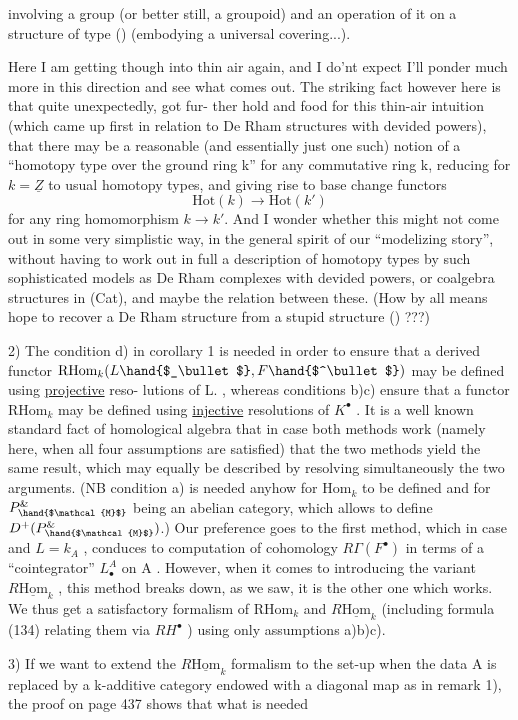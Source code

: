 
involving a group (or better still, a groupoid) and an operation of 
it on a structure of type (\unsure{$\ast$}) (embodying a universal covering...).

Here I am getting though into thin air again, and I do'nt expect
I'll ponder much more in this direction and see what comes out. The
striking fact however  here is that quite unexpectedly,  got fur-%
ther hold and food for this thin-air intuition (which came up first in
relation to De Rham structures with devided powers), that there may be
a reasonable (and essentially just one such) notion of a ``homotopy type
over the ground ring k'' for any commutative ring k, reducing for $k=\underline{Z}$
to usual homotopy types, and giving rise to base change functors
\[ \mathrm{Hot}(k) \longrightarrow \mathrm{Hot}(k') \]
for any ring homomorphism $k\to k'$. And I wonder whether this might not
come out in some very simplistic way, in the general spirit of our
``modelizing story'', without having to work out in full a description
of homotopy types by such sophisticated models as De Rham complexes
with devided powers, or coalgebra structures in (Cat), and  maybe the
relation between these. (How by all means hope to recover a De Rham
structure from a stupid structure (\unsure{$\ast$}) ???)

2) The condition d) in corollary 1 is needed in order to ensure
 that a derived functor $\mathrm{RHom}_k(L\hand{$_\bullet$},F\hand{$^\bullet$})$ may be defined using \uline{projective} reso-%
lutions of L. , whereas conditions b)\hand{,}c) ensure that a functor
$\mathrm{RHom}_k$ may be defined using  \uline{injective} resolutions of $K^\bullet$ . It is
a well known standard fact of homological algebra that in case both
methods work (namely here, when all four assumptions are satisfied)
that the two methods yield the same result, which may equally be
described by resolving simultaneously the two arguments. (NB condition
a) is needed anyhow for $\mathrm{Hom}_k$ to be defined and for $P^{\&}_{\hand{$\mathcal{M}$}}$ being an abelian
category, which allows to define $D^+(P^{\&}_{\hand{$\mathcal{M}$}})$.) Our preference goes to
the first method, which in case   and $L = k_A$ , conduces to
computation of cohomology $R\Gamma(F^\bullet)$ in terms of a ``cointegrator'' $L_\bullet^A$ on
A . However, when it comes to introducing the variant $R\underline{\mathrm{Hom}}_k$ , this
method breaks down, as we saw, it is the other one which works. We
thus get a satisfactory formalism of $\mathrm{RHom}_k$ and $R\underline{\mathrm{Hom}}_k$ (including formula
(134) relating them via $RH^\bullet$ ) using only assumptions a)b)c).

3) If we want to extend the $R\underline{\mathrm{Hom}}_k$ formalism to the set-up when
the data A is replaced by a k-additive category  endowed with a diagonal
map as in remark 1), the proof on page 437 shows that what is needed

